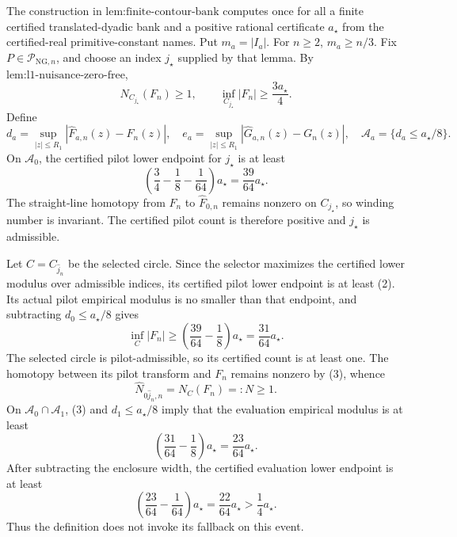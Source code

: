 The construction in \(\text{lem:finite-contour-bank}\) computes once for all a finite certified translated-dyadic bank and a positive rational certificate \(a_{\star}\) from the certified-real primitive-constant names.  Put \(m_a=|I_a|\).  For \(n\ge2\), \(m_a\ge n/3\).  Fix \(P\in\mathcal P_{\mathrm{NG},n}\), and choose an index \(j_{\star}\) supplied by that lemma.  By \(\text{lem:l1-nuisance-zero-free}\),
\[
 N_{C_{j_{\star}}}(F_n)\ge1,
 \qquad
 \inf_{C_{j_{\star}}}|F_n|
 \ge\frac{3a_{\star}}4. \tag{1}
\]
Define
\[
 d_a=\sup_{|z|\le R_1}|\widehat F_{a,n}(z)-F_n(z)|,
 \quad
 e_a=\sup_{|z|\le R_1}|\widehat G_{a,n}(z)-G_n(z)|,
 \quad
 \mathcal A_a=\{d_a\le a_{\star}/8\}.
\]
On \(\mathcal A_0\), the certified pilot lower endpoint for \(j_{\star}\) is at least
\[
 \left(\frac34-\frac18-\frac1{64}\right)a_{\star}
 =\frac{39}{64}a_{\star}. \tag{2}
\]
The straight-line homotopy from \(F_n\) to \(\widehat F_{0,n}\) remains nonzero on \(C_{j_{\star}}\), so winding number is invariant.  The certified pilot count is therefore positive and \(j_{\star}\) is admissible.

Let \(C=C_{\widehat j_n}\) be the selected circle.  Since the selector maximizes the certified lower modulus over admissible indices, its certified pilot lower endpoint is at least (2).  Its actual pilot empirical modulus is no smaller than that endpoint, and subtracting \(d_0\le a_{\star}/8\) gives
\[
 \inf_C|F_n|
 \ge\left(\frac{39}{64}-\frac18\right)a_{\star}
 =\frac{31}{64}a_{\star}. \tag{3}
\]
The selected circle is pilot-admissible, so its certified count is at least one.  The homotopy between its pilot transform and \(F_n\) remains nonzero by (3), whence
\[
 \widehat N_{0\widehat j_n,n}=N_C(F_n)=:N\ge1. \tag{4}
\]
On \(\mathcal A_0\cap\mathcal A_1\), (3) and \(d_1\le a_{\star}/8\) imply that the evaluation empirical modulus is at least
\[
 \left(\frac{31}{64}-\frac18\right)a_{\star}
 =\frac{23}{64}a_{\star}.
\]
After subtracting the enclosure width, the certified evaluation lower endpoint is at least
\[
 \left(\frac{23}{64}-\frac1{64}\right)a_{\star}
 =\frac{22}{64}a_{\star}>\frac14a_{\star}. \tag{5}
\]
Thus the definition does not invoke its fallback on this event.

